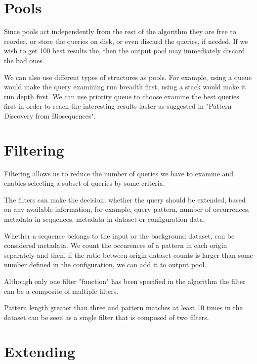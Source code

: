 \section{Pools}

Since pools act independently from the rest of the algorithm they are free to reorder, or store the queries on disk, or even discard the queries, if needed. If we wish to get 100 best results the, then the output pool may immediately discard the bad ones.

We can also use different types of structures as pools. For example, using a queue would make the query examining run breadth first, using a stack would make it run depth first. We can use priority queue to choose examine the best queries first in order to reach the interesting results faster as suggested in "Pattern Discovery from Biosequences"\cite{spexs}.

\section{Filtering}

Filtering allows us to reduce the number of queries we have to examine and enables selecting a subset of queries by some criteria.

The filters can make the decision, whether the query should be extended, based on any available information, for example, query pattern, number of occurrences, metadata in sequences, metadata in dataset or configuration data.

\begin{exmp}
Whether a sequence belongs to the input or the background dataset, can be considered metadata. We count the occurences of a pattern in each origin separately and then, if the ratio between origin dataset counts is larger than some number defined in the configuration, we can add it to output pool.
\end{exmp}

Although only one filter "function" has been specified in the algorithm the filter can be a composite of multiple filters.

\begin{exmp}
Pattern length greater than three and pattern matches at least 10 times in the dataset can be seen as a single filter that is composed of two filters.
\end{exmp}

\section{Extending}

